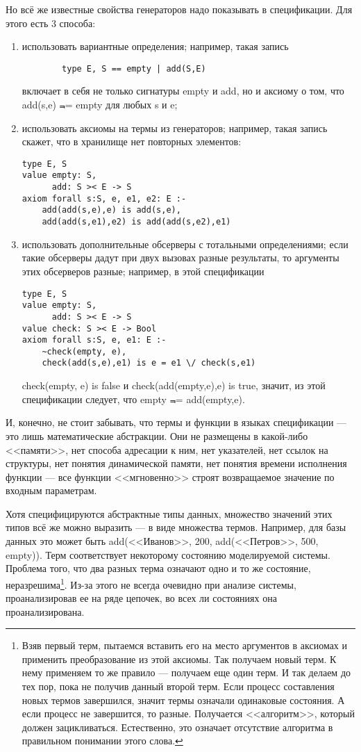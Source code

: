 Но всё же известные свойства генераторов надо показывать в спецификации. Для этого есть 3 способа:
\begin{enumerate}
  \item использовать вариантные определения; например, такая запись
      \begin{lstlisting}
        type E, S == empty | add(S,E)
      \end{lstlisting}
      включает в себя не только сигнатуры empty и add, но и аксиому о том, что add(s,e) $\Not$= empty для любых s и e;
  \item использовать аксиомы на термы из генераторов; например, такая запись скажет, что в хранилище нет повторных элементов:
\begin{lstlisting}
type E, S
value empty: S,
      add: S >< E -> S
axiom forall s:S, e, e1, e2: E :-
    add(add(s,e),e) is add(s,e),
    add(add(s,e1),e2) is add(add(s,e2),e1)
\end{lstlisting}
   \item использовать дополнительные обсерверы с тотальными определениями; если такие обсерверы дадут при двух вызовах разные результаты, то аргументы этих обсерверов разные; например, в этой спецификации
\begin{lstlisting}
type E, S
value empty: S,
      add: S >< E -> S
value check: S >< E -> Bool
axiom forall s:S, e, e1: E :-
    ~check(empty, e),
    check(add(s,e),e1) is e = e1 \/ check(s,e1)
\end{lstlisting}
    check(empty, e) is false и check(add(empty,e),e) is true, значит, из этой спецификации следует, что empty $\Not$= add(empty,e).
\end{enumerate}

И, конечно, не стоит забывать, что термы и функции в языках спецификации --- это лишь математические абстракции. Они не размещены в какой-либо <<памяти>>, нет способа адресации к ним, нет указателей, нет ссылок на структуры, нет понятия динамической памяти, нет понятия времени исполнения функции --- все функции <<мгновенно>> строят возвращаемое значение по входным параметрам.


Хотя специфицируются абстрактные типы данных, множество значений этих типов всё же можно выразить --- в виде множества термов. Например, для базы данных это может быть add(<<Иванов>>, 200, add(<<Петров>>, 500, empty)). Терм соответствует некоторому состоянию моделируемой системы. Проблема того, что два разных терма означают одно и то же состояние, неразрешима\footnote{Взяв первый терм, пытаемся вставить его на место аргументов в аксиомах и применить преобразование из этой аксиомы. Так получаем новый терм. К нему применяем то же правило --- получаем еще один терм. И так делаем до тех пор, пока не получив данный второй терм. Если процесс составления новых термов завершился, значит термы означали одинаковые состояния. А если процесс не завершится, то разные. Получается <<алгоритм>>, который должен зацикливаться. Естественно, это означает отсутствие алгоритма в правильном понимании этого слова.}. Из-за этого не всегда очевидно при анализе системы, проанализировав ее на ряде цепочек, во всех ли состояниях она проанализирована.

